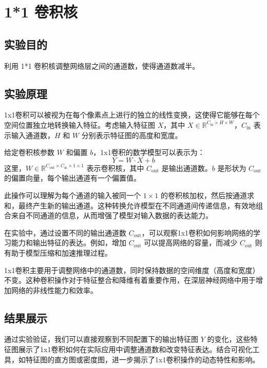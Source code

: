 \documentclass[a4paper,12pt]{article}
\begin{document}
\newpage
\section{1*1 卷积核}
\subsection{实验目的}
利用 1*1 卷积核调整网络层之间的通道数，使得通道数减半。
\subsection{实验原理}
1x1卷积可以被视为在每个像素点上进行的独立的线性变换，这使得它能够在每个空间位置独立地转换输入特征。考虑输入特征图 \(X\)，其中 \(X \in \mathbb{R}^{C_{\text{in}} \times H \times W}\)，\(C_{\text{in}}\) 表示输入通道数，\(H\) 和 \(W\) 分别表示特征图的高度和宽度。

给定卷积核参数 \(W\) 和偏置 \(b\)，1x1卷积的数学模型可以表示为：
\[
Y = W \cdot X + b
\]
这里，\(W \in \mathbb{R}^{C_{\text{out}} \times C_{\text{in}} \times 1 \times 1}\) 表示卷积核，其中 \(C_{\text{out}}\) 是输出通道数。\(b\) 是形状为 \(C_{\text{out}}\) 的偏置向量，每个输出通道有一个偏置值。

此操作可以理解为每个通道的输入被同一个 \(1 \times 1\) 的卷积核加权，然后按通道求和，最终产生新的输出通道。这种转换允许模型在不同通道间传递信息，有效地组合来自不同通道的信息，从而增强了模型对输入数据的表达能力。

在实验中，通过设置不同的输出通道数 \(C_{\text{out}}\)，可以观察1x1卷积如何影响网络的学习能力和输出特征的表达。例如，增加 \(C_{\text{out}}\) 可以提高网络的容量，而减少 \(C_{\text{out}}\) 则有助于模型压缩和加速推理过程。

1x1卷积主要用于调整网络中的通道数，同时保持数据的空间维度（高度和宽度）不变。这种卷积操作对于特征整合和降维有着重要作用，在深层神经网络中用于增加网络的非线性能力和效率。

\subsection{结果展示}

通过实验验证，我们可以直接观察到不同配置下的输出特征图 \(Y\) 的变化，这些特征图展示了1x1卷积如何在实际应用中调整通道数和改变特征表达。结合可视化工具，如特征图的直方图或密度图，进一步揭示了1x1卷积操作的动态特性和影响。
\end{document}
